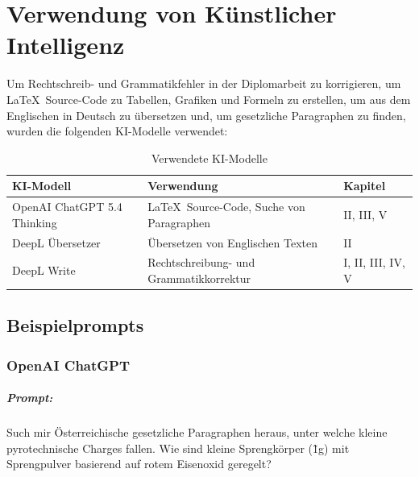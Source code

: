 \appendix
\chapter{Verwendung von Künstlicher Intelligenz}
\label{ch:ai_use}
Um Rechtschreib- und Grammatikfehler in der Diplomarbeit zu korrigieren, um \LaTeX \, Source-Code zu Tabellen, Grafiken und Formeln zu erstellen, um aus dem Englischen in Deutsch zu übersetzen und, um gesetzliche Paragraphen zu finden, wurden die folgenden KI-Modelle verwendet:
\begin{table}[H]
    \centering
    \begin{tabular}{|l|l|l|}
        \hline
        \textbf{KI-Modell} & \textbf{Verwendung} & \textbf{Kapitel} \\
        \hline
        OpenAI ChatGPT 5.4 Thinking & \LaTeX \, Source-Code, Suche von Paragraphen & II, III, V \\
        DeepL Übersetzer & Übersetzen von Englischen Texten & II \\
        DeepL Write & Rechtschreibung- und Grammatikkorrektur & I, II, III, IV, V \\
        \hline
    \end{tabular}
    \caption{Verwendete KI-Modelle}
    \label{tab:used_ai_models}
\end{table}

\section{Beispielprompts}
\label{sec:example_prompts}
\subsection{OpenAI ChatGPT}
\label{subsec:chatgpt_prompts}

\paragraph{Prompt:}
Such mir Österreichische gesetzliche Paragraphen heraus, unter welche kleine pyrotechnische Charges fallen. Wie sind kleine Sprengkörper (\~1g) mit Sprengpulver basierend auf rotem Eisenoxid geregelt?

